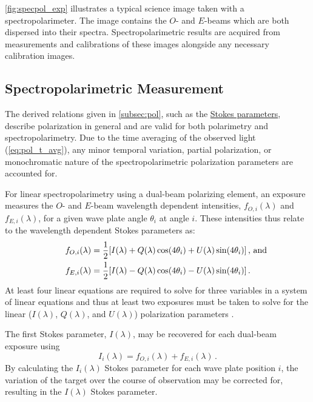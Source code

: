 \autoref{fig:specpol_exp} illustrates a typical science image taken with a spectropolarimeter.
The image contains the $O$- and $E$-beams which are both dispersed into their spectra.
Spectropolarimetric results are acquired from measurements and calibrations of these images alongside any necessary calibration images.

\pagebreak

\subsection{Spectropolarimetric Measurement}

The derived relations given in \autoref{subsec:pol}, such as the \hyperref[eq:Stokes_params]{Stokes parameters}, describe polarization in general and are valid for both polarimetry and spectropolarimetry.
Due to the time averaging of the observed light (\autoref{eq:pol_t_avg}), any minor temporal variation, partial polarization, or monochromatic nature of the spectropolarimetric polarization parameters are accounted for.

For linear spectropolarimetry using a dual-beam polarizing element, an exposure measures the $O$- and $E$-beam wavelength dependent intensities, $f_{O, i}(\lambda)$ and $f_{E, i}(\lambda)$, for a given wave plate angle $\theta_{i}$ at angle $i$.
These intensities thus relate to the wavelength dependent Stokes parameters as:
\begin{equation} \label{eq:specpol_flux_to_Stokes}
    \begin{aligned}
        f_{O, i}(\lambda) &= \frac{1}{2} [I(\lambda) + Q(\lambda)\cos(4\theta_{i}) + U(\lambda)\sin(4\theta_{i})] \rlap{\,,\ and}\\
        f_{E, i}(\lambda) &= \frac{1}{2} [I(\lambda) - Q(\lambda)\cos(4\theta_{i}) - U(\lambda)\sin(4\theta_{i})]\,.
    \end{aligned}
\end{equation}
At least four linear equations are required to solve for three variables in a system of linear equations and thus at least two exposures must be taken to solve for the linear ($I(\lambda)$, $Q(\lambda)$, and $U(\lambda)$) polarization parameters \citep{pol_std, keller_instr}.

The first Stokes parameter, $I(\lambda)$, may be recovered for each dual-beam exposure using
\begin{equation} \label{eq:specpol_I_calc}
    I_{i}(\lambda) = f_{O, i}(\lambda) + f_{E, i}(\lambda)\,.
\end{equation}
By calculating the $I_{i}(\lambda)$ Stokes parameter for each wave plate position $i$, the variation of the target over the course of observation may be corrected for, resulting in the $I(\lambda)$ Stokes parameter.

